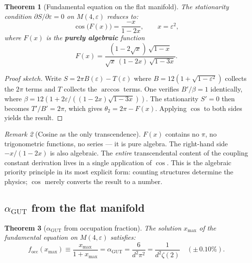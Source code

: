 \documentclass[12pt]{article}
\newtheorem{theorem}{Theorem}[section]
\theoremstyle{remark}
\newtheorem{remark}[theorem]{Remark}
\theoremstyle{definition}
\begin{document}
\begin{theorem}[Fundamental equation on the flat manifold]
\label{thm:fundamental_eq}
The stationarity condition $\partial S/\partial\varepsilon = 0$ on $M(4,\varepsilon)$ reduces to:
\begin{equation}
\boxed{\cos\bigl(F(x)\bigr) = \frac{-x}{1-2x}, \qquad x = \varepsilon^2,}
\end{equation}
where $F(x)$ is the \textbf{purely algebraic} function
\begin{equation}
F(x) = \frac{(1-2\sqrt{x})\,\sqrt{1-x}}{\sqrt{x}\,(1-2x)\,\sqrt{1-3x}}.
\end{equation}
\end{theorem}
\begin{proof}[Proof sketch]
Write $S = 2\pi B(\varepsilon) - T(\varepsilon)$ where $B = 12(1 + \sqrt{1\!-\!\varepsilon^2})$ collects the $2\pi$ terms and $T$ collects the $\arccos$ terms.  One verifies $B'/\beta = 1$ identically, where $\beta = 12(1 + 2\varepsilon/((1\!-\!2x)\sqrt{1\!-\!3x}))$.  The stationarity $S' = 0$ then becomes $T'/B' = 2\pi$, which gives $\theta_2 = 2\pi - F(x)$.  Applying $\cos$ to both sides yields the result.
\end{proof}

\begin{remark}[Cosine as the only transcendence]
$F(x)$ contains no $\pi$, no trigonometric functions, no series --- it is pure algebra.  The right-hand side $-x/(1\!-\!2x)$ is also algebraic.  The \emph{entire} transcendental content of the coupling constant derivation lives in a single application of $\cos$.  This is the algebraic priority principle in its most explicit form: counting structures determine the physics; $\cos$ merely converts the result to a number.
\end{remark}

\subsection{$\alpha_\text{GUT}$ from the flat manifold}
\label{sec:alpha_manifold}

\begin{theorem}[$\alpha_\text{GUT}$ from occupation fraction]
\label{thm:alpha_manifold}
The solution $x_{\max}$ of the fundamental equation on $M(4,\varepsilon)$ satisfies:
\begin{equation}
\boxed{f_{\mathrm{occ}}(x_{\max}) \equiv \frac{x_{\max}}{1+x_{\max}} = \alpha_\text{GUT} = \frac{6}{d^2\pi^2} = \frac{1}{d^2\zeta(2)} \quad (\pm\,0.10\%).}
\end{equation}
\end{theorem}
\end{document}
